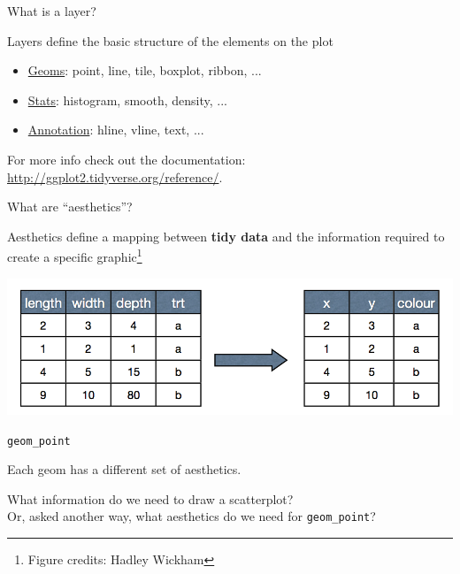 \documentclass[table]{beamer}\usepackage[]{graphicx}\usepackage[]{xcolor}
\begin{document}
\begin{frame}[fragile]{What is a layer?}


\begin{block}{Layers define the basic structure of the elements on the plot}
\begin{itemize}
    \item \href{https://ggplot2.tidyverse.org/reference/#section-geoms}{Geoms}: point, line, tile, boxplot, ribbon, ...
    \item \href{https://ggplot2.tidyverse.org/reference/#section-stats}{Stats}: histogram, smooth, density, ...
    \item \href{https://ggplot2.tidyverse.org/reference/#section-annotations}{Annotation}: hline, vline, text, ...
\end{itemize}

For more info check out the documentation: \href{http://ggplot2.tidyverse.org/reference/}{http://ggplot2.tidyverse.org/reference/}.

\end{block}

\end{frame}


\begin{frame}[fragile]{What are ``aesthetics''?}

Aesthetics define a mapping between {\bf tidy data} and the information required to create a specific graphic\footnote{Figure credits: Hadley Wickham}

\includegraphics[width=\textwidth]{figure-static/aes.png}

\end{frame}



\begin{frame}[fragile]{\tt{geom\_point}}


Each geom has a different set of aesthetics.

What information do we need to draw a scatterplot? \\
Or, asked another way, what aesthetics do we need for {\tt geom\_point}?

\end{frame}
\end{document}
